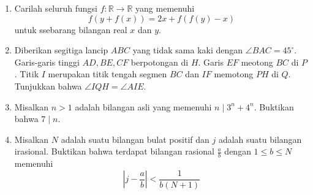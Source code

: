 \documentclass[12pt]{scrartcl}
\begin{document}
\begin{enumerate}[resume]
	\item Carilah seluruh fungsi $f:\mathbb{R}\rightarrow\mathbb{R}$ yang memenuhi
	$$f(y+f(x))=2x+f(f(y)-x)$$ untuk ssebarang bilangan real $x$ dan $y$.
	
	\item Diberikan segitiga lancip $ABC$ yang tidak sama kaki dengan $\angle BAC = 45^\circ$. Garis-garis tinggi $AD,BE,CF$ berpotongan di $H$. Garis $EF$ meotong $BC$ di $P$. Titik $I$ merupakan titik tengah segmen $BC$ dan $IF$ memotong $PH$ di $Q$. Tunjukkan bahwa $\angle IQH = \angle AIE$.
	
	\item Misalkan $n > 1$ adalah bilangan asli yang memenuhi $n \mid 3^n+4^n$. Buktikan bahwa $7 \mid n$.
	
	\item Misalkan $N$ adalah suatu bilangan bulat positif dan $j$ adalah suatu bilangan irasional. Buktikan bahwa terdapat bilangan rasional $\frac{a}{b}$ dengan $1 \le b \le N$ memenuhi $$\left | j-\frac{a}{b} \right | < \frac{1}{b(N+1)}$$
\end{enumerate}
\end{document}
